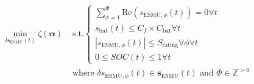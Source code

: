 \begin{equation}
\begin{split}
	\min_{\delta \textbf{s}_\text{ESMU}(t)} \zeta(\boldsymbol{\alpha})
	&\text{ s.t.}
	\begin{cases}
		\sum_{\phi=1}^{\Phi} \text{Re} \left(s_{\text{ESMU},\phi}(t)\right) = 0 \forall t\\
		s_\text{bat}(t) \leq C_f\times C_\text{bat} \forall t\\
		\left|s_{\text{ESMU},\phi}(t)\right| \leq S_\text{rating} \forall \phi \forall t\\
		0 \leq SOC(t) \leq 1 \forall t
	\end{cases}\\
	&\text{ where } \delta s_{\text{ESMU},\phi}(t) \in \textbf{s}_\text{ESMU}(t) \text{ and } \Phi \in \mathbb{Z}^{>0}
\end{split}
\label{ch1:equ:closed-loop-minimisation}
\end{equation}
